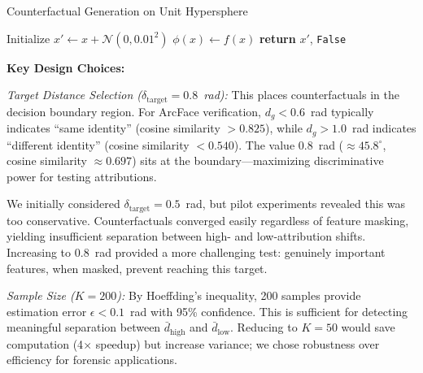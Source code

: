\begin{algorithm}[!t]
\caption{Counterfactual Generation on Unit Hypersphere}
\label{alg:counterfactual}
Initialize $x' \gets x + \mathcal{N}(0, 0.01^2)$ 
$\phi(x) \gets f(x)$ 
\textbf{return} $x'$, \texttt{False} 
\end{algorithm}

\textbf{Key Design Choices:}

\textit{Target Distance Selection ($\delta_{\text{target}} = 0.8$~rad):} This places counterfactuals in the decision boundary region. For ArcFace verification, $d_g < 0.6$~rad typically indicates ``same identity'' (cosine similarity $> 0.825$), while $d_g > 1.0$~rad indicates ``different identity'' (cosine similarity $< 0.540$). The value $0.8$~rad ($\approx 45.8^\circ$, cosine similarity $\approx 0.697$) sits at the boundary—maximizing discriminative power for testing attributions.

We initially considered $\delta_{\text{target}} = 0.5$~rad, but pilot experiments revealed this was too conservative. Counterfactuals converged easily regardless of feature masking, yielding insufficient separation between high- and low-attribution shifts. Increasing to $0.8$~rad provided a more challenging test: genuinely important features, when masked, prevent reaching this target.

\textit{Sample Size ($K=200$):} By Hoeffding's inequality, 200 samples provide estimation error $\epsilon < 0.1$~rad with 95\% confidence. This is sufficient for detecting meaningful separation between $\bar{d}_{\text{high}}$ and $\bar{d}_{\text{low}}$. Reducing to $K=50$ would save computation (4$\times$ speedup) but increase variance; we chose robustness over efficiency for forensic applications.

